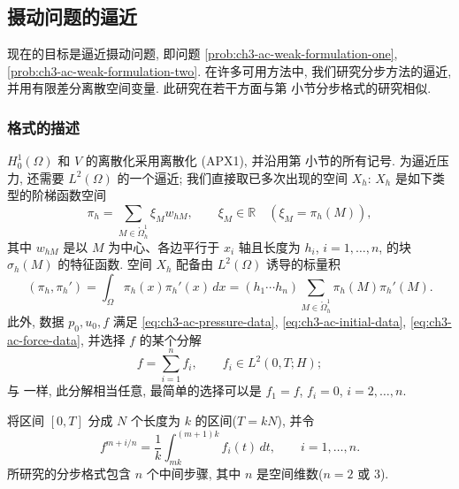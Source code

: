 \subsection{摄动问题的逼近}
\label{subsec:ch3-ac-numerical}

现在的目标是逼近摄动问题, 即问题 \ref{prob:ch3-ac-weak-formulation-one}, \ref{prob:ch3-ac-weak-formulation-two}. 在许多可用方法中, 我们研究分步方法的逼近, 并用有限差分离散空间变量. 此研究在若干方面与第  小节分步格式的研究相似.

\subsubsection{格式的描述}
\label{subsubsec:ch3-ac-scheme-description}

$H_0^1(\Omega)$ 和 $V$ 的离散化采用离散化 (APX1), 并沿用第  小节的所有记号. 为逼近压力, 还需要 $L^2(\Omega)$ 的一个逼近; 我们直接取已多次出现的空间 $X_h$: $X_h$ 是如下类型的阶梯函数空间
\begin{equation}
\pi_h=\sum_{M\in\mathring\Omega_h^1}\xi_M w_{hM},
\qquad \xi_M\in\mathbb R
\quad(\xi_M=\pi_h(M)),
\label{eq:ch3-ac-pressure-step-space}
\end{equation}
其中 $w_{hM}$ 是以 $M$ 为中心、各边平行于 $x_i$ 轴且长度为 $h_i$, $i=1,\ldots,n$, 的块 $\sigma_h(M)$ 的特征函数. 空间 $X_h$ 配备由 $L^2(\Omega)$ 诱导的标量积
\begin{equation}
(\pi_h,\pi_h')=\int_\Omega\pi_h(x)\pi_h'(x)\,dx
=(h_1\cdots h_n)\sum_{M\in\mathring\Omega_h^1}
\pi_h(M)\pi_h'(M).
\label{eq:ch3-ac-pressure-step-inner-product}
\end{equation}
此外, 数据 $p_0,u_0,f$ 满足 \eqref{eq:ch3-ac-pressure-data}, \eqref{eq:ch3-ac-initial-data}, \eqref{eq:ch3-ac-force-data}, 并选择 $f$ 的某个分解
\begin{equation}
f=\sum_{i=1}^n f_i,
\qquad f_i\in L^2(0,T;H);
\label{eq:ch3-ac-force-decomposition}
\end{equation}
与  一样, 此分解相当任意, 最简单的选择可以是 $f_1=f$, $f_i=0$, $i=2,\ldots,n$.

\hypertarget{chapter-03-page-315}{}
将区间 $[0,T]$ 分成 $N$ 个长度为 $k$ 的区间($T=kN$), 并令
\begin{equation}
f^{m+i/n}=\frac1k\int_{mk}^{(m+1)k}f_i(t)\,dt,
\qquad i=1,\ldots,n.
\label{eq:ch3-ac-force-fractional-average}
\end{equation}
所研究的分步格式包含 $n$ 个中间步骤, 其中 $n$ 是空间维数($n=2$ 或 $3$).

